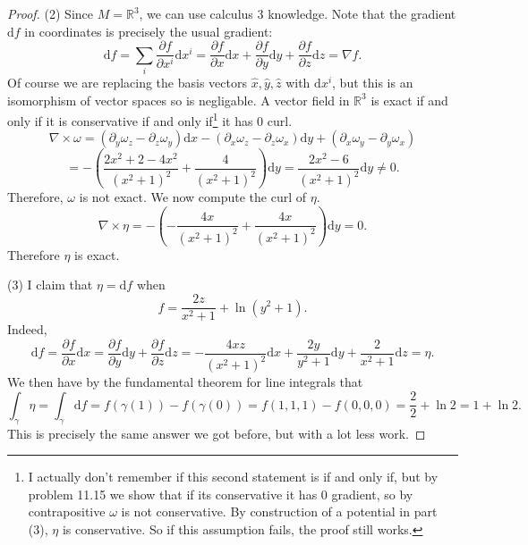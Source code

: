 \documentclass[11pt, letterpaper]{article}
\begin{document}
\begin{proof}
(2) Since $M=\mathbb{R} ^3$, we can use calculus 3 knowledge. Note that the gradient $\mathrm{d} f$ in coordinates is precisely the usual gradient:
\[
	\mathrm{d} f= \sum_{i} \frac{\partial f}{\partial x^i} \mathrm{d} x^i = \frac{\partial f}{\partial x} \mathrm{d} x+\frac{\partial f}{\partial y} \mathrm{d} y + \frac{\partial f}{\partial z} \mathrm{d} z=\nabla f.
\]
Of course we are replacing the basis vectors $\hat{x} ,\hat{y} ,\hat{z} $ with $\mathrm{d} x^i$, but this is an isomorphism of vector spaces so is negligable. A vector field in $\mathbb{R} ^3$ is exact if and only if it is conservative if and only if\footnote{I actually don't remember if this second statement is if and only if, but by problem 11.15 we show that if its conservative it has 0 gradient, so by contrapositive $\omega $ is not conservative. By construction of a potential in part (3),  $\eta $ is conservative. So if this assumption fails, the proof still works.} it has 0 curl.
\[
	\nabla \times \omega =\left( \partial _y\omega _z - \partial _z \omega _y \right) \mathrm{d} x - \left( \partial _x \omega _z - \partial _z\omega _x \right) \mathrm{d} y + \left( \partial _x \omega _y - \partial _y\omega _x \right) 
\]
\[
	=-\left( \frac{2x^2+2-4x^2}{\left( x^2+1 \right) ^2} +\frac{4}{\left( x^2+1 \right) ^2}  \right) \mathrm{d} y=\frac{2x^2-6}{\left( x^2+1 \right) ^2} \mathrm{d} y \neq 0
.\]
Therefore, $\omega $ is not exact. We now compute the curl of $\eta $.
\[
	\nabla \times \eta =-\left( -\frac{4x}{\left( x^2+1 \right) ^2} +\frac{4x}{\left( x^2+1 \right) ^2}  \right) \mathrm{d} y=0
.\]
Therefore $\eta $ is exact.

(3) I claim that $\eta =\mathrm{d} f$ when
\[
	f=\frac{2z}{x^2+1} + \ln \left( y^2+1 \right) 
.\]
Indeed,
\[
	\mathrm{d} f = \frac{\partial f}{\partial x} \mathrm{d} x = \frac{\partial f}{\partial y} \mathrm{d} y + \frac{\partial f}{\partial z} \mathrm{d} z=-\frac{4xz}{\left( x^2+1 \right) ^2} \mathrm{d} x + \frac{2y}{y^2+1} \mathrm{d} y + \frac{2}{x^2+1} \mathrm{d} z=\eta 
.\]
We then have by the fundamental theorem for line integrals that
\[
	\int_\gamma \eta =\int_\gamma \mathrm{d} f=f(\gamma (1))-f(\gamma (0))=f(1,1,1)-f(0,0,0)=\frac{2}{2} +\ln 2=1+\ln 2
.\]
This is precisely the same answer we got before, but with a lot less work.
\end{proof}
\end{document}
